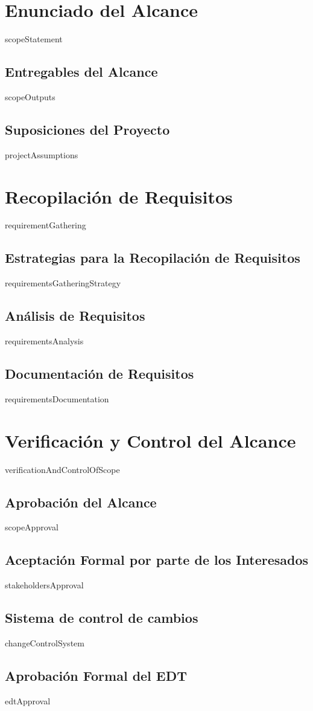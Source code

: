 \documentclass{article}
\begin{document}
    \section{Enunciado del Alcance}
    {{scopeStatement}}
    \subsection{Entregables del Alcance}
    {{scopeOutputs}}
    \subsection{Suposiciones del Proyecto}
    {{projectAssumptions}}

    \section{Recopilación de Requisitos}
    {{requirementGathering}}
    \subsection{Estrategias para la Recopilación de Requisitos}
    {{requirementsGatheringStrategy}}
    \subsection{Análisis de Requisitos}
    {{requirementsAnalysis}}
    \subsection{Documentación de Requisitos}
    {{requirementsDocumentation}}

    \section{Verificación y Control del Alcance}
    {{verificationAndControlOfScope}}
    \subsection{Aprobación del Alcance}
    {{scopeApproval}}
    \subsection{Aceptación Formal por parte de los Interesados}
    {{stakeholdersApproval}}
    \subsection{Sistema de control de cambios}
    {{changeControlSystem}}
    \subsection{Aprobación Formal del EDT}
    {{edtApproval}}
\end{document}
